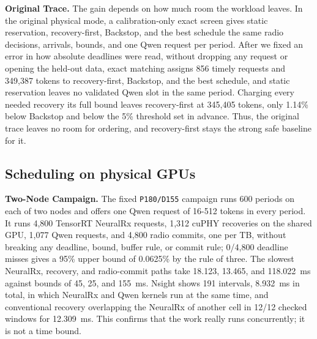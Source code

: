 \documentclass[acmsmall,screen,review,anonymous]{acmart}
\newcommand{\sys}{Backstop\xspace}
\newcommand{\NRx}{NeuralRx\xspace}
\begin{document}
\noindent\textbf{Original Trace.}
The gain depends on how much room the workload leaves. In the original physical mode, a calibration-only
exact screen gives static reservation, recovery-first, \sys, and the best schedule the same radio
decisions, arrivals, bounds, and one Qwen request per period. After we fixed an error in how absolute
deadlines were read, without dropping any request or opening the held-out data, exact matching assigns
856 timely requests and 349,387 tokens to recovery-first, \sys, and the best schedule, and static
reservation leaves no validated Qwen slot in the same period. Charging every needed recovery its full
bound leaves recovery-first at 345,405 tokens, only 1.14\% below \sys and below the 5\% threshold set in
advance. Thus, the original trace leaves no room for ordering, and recovery-first stays the strong safe
baseline for it.

\subsection{Scheduling on physical GPUs}
\label{sec:eval-online}

\noindent\textbf{Two-Node Campaign.}
The fixed \texttt{P180/D155} campaign runs 600 periods on each of two nodes and offers one Qwen request of
16-512 tokens in every period. It runs 4,800 TensorRT \NRx requests, 1,312 cuPHY recoveries on the
shared GPU, 1,077 Qwen requests, and 4,800 radio commits, one per TB, without breaking any deadline,
bound, buffer rule, or commit rule; 0/4,800 deadline misses gives a 95\% upper bound of 0.0625\% by the
rule of three. The slowest \NRx, recovery, and radio-commit paths take 18.123, 13.465, and 118.022~ms
against bounds of 45, 25, and 155~ms. Nsight shows 191 intervals, 8.932~ms in total, in which \NRx and
Qwen kernels run at the same time, and conventional recovery overlapping the \NRx of another cell in
12/12 checked windows for 12.309~ms. This confirms that the work really runs concurrently; it is not a
time bound.
\end{document}
